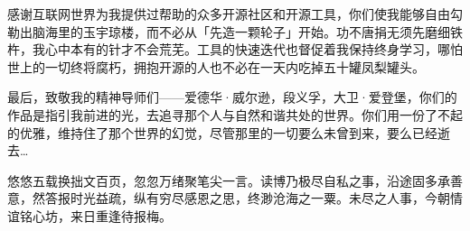 \begin{ack}
    感谢互联网世界为我提供过帮助的众多开源社区和开源工具，你们使我能够自由勾勒出脑海里的玉宇琼楼，而不必从「先造一颗轮子」开始。功不唐捐无须先磨细铁杵，我心中本有的针才不会荒芜。工具的快速迭代也督促着我保持终身学习，哪怕世上的一切终将腐朽，拥抱开源的人也不必在一天内吃掉五十罐凤梨罐头。
    
    最后，致敬我的精神导师们——爱德华·威尔逊，段义孚，大卫·爱登堡，你们的作品是指引我前进的光，去追寻那个人与自然和谐共处的世界。你们用一份了不起的优雅，维持住了那个世界的幻觉，尽管那里的一切要么未曾到来，要么已经逝去\ldots
    
    悠悠五载换拙文百页，忽忽万绪聚笔尖一言。读博乃极尽自私之事，沿途固多承善意，然答报时光益疏，纵有穷尽感恩之思，终渺沧海之一粟。未尽之人事，今朝情谊铭心坊，来日重逢待报梅。
\end{ack}
